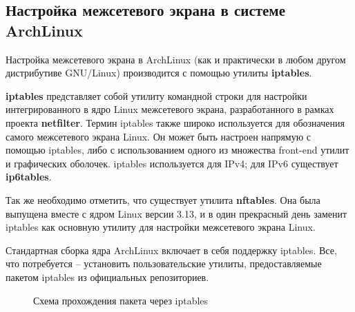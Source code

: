 \documentclass[a4paper]{article}
\begin{document}
	\subsection{Настройка межсетевого экрана в системе ArchLinux}
	
	Настройка межсетевого экрана в ArchLinux (как и практически в любом другом дистрибутиве GNU/Linux) производится с помощью утилиты \textbf{iptables}.
	
	\textbf{iptables} представляет собой утилиту командной строки для настройки интегрированного в ядро Linux межсетевого экрана, разработанного в рамках проекта \textbf{netfilter}. Термин iptables также широко используется для обозначения самого межсетевого экрана Linux. Он может быть настроен напрямую с помощью iptables, либо с использованием одного из множества front-end утилит и графических оболочек. iptables используется для IPv4; для IPv6 существует \textbf{ip6tables}.
	
	Так же необходимо отметить, что существует утилита \textbf{nftables}. Она была выпущена вместе с ядром Linux версии 3.13, и в один прекрасный день заменит iptables как основную утилиту для настройки межсетевого экрана Linux.
	
	Стандартная сборка ядра ArchLinux включает в себя поддержку iptables. Все, что потребуется -- установить пользовательские утилиты, предоставляемые пакетом iptables из официальных репозиториев.
	\begin{figure}[H]
		\caption{Схема прохождения пакета через iptables}
		\label{fig:ipTablesScheme}
	\end{figure}
	
\end{document}
